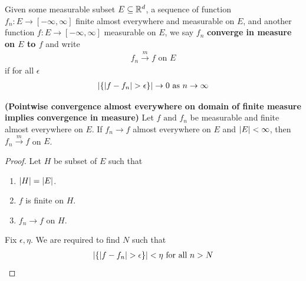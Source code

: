 \documentclass{report}
\begin{document}
\begin{mdframed}
Given some measurable subset $E\subseteq \mathbb{R}^d$, a sequence of function $f_n:E\rightarrow [-\infty, \infty]$ finite almost everywhere and measurable on $E$, and another function $f:E\rightarrow [-\infty, \infty]$ measurable on $E$, we say $f_n$  \textbf{converge in measure on $E$ to $f$} and write 
\begin{align*}
f_n \overset{m}{\to}f\text{ on }E
\end{align*}
if for all $\epsilon $
\begin{align*}
\abso{\set{ \abso{f-f_n}>\epsilon }}\to 0\text{ as }n\to \infty
\end{align*}
\end{mdframed}
\begin{theorem}
\textbf{(Pointwise convergence almost everywhere on domain of finite measure implies convergence in measure)} Let $f\text{ and }f_n$ be measurable and finite almost everywhere on $E$. If  $f_n \to f$ almost everywhere on $E$ and  $\left|E\right|<\infty$, then $f_n\overset{m}{\to}f$ on $E$. 
\end{theorem}
\begin{proof}
Let $H$ be subset of  $E$ such that 
\begin{enumerate}[label=(\alph*)]
  \item $\left|H\right|=\left|E\right|$.
  \item $f$ is finite on $H$.
  \item $f_n \to f$ on $H$.  
\end{enumerate}
Fix $\epsilon,\eta  $. We are required to find $N$ such that 
\begin{align*}
\abso{\set{\abso{f-f_n}>\epsilon }}< \eta\text{ for all }n>N 
\end{align*}

\end{proof}
\end{document}

